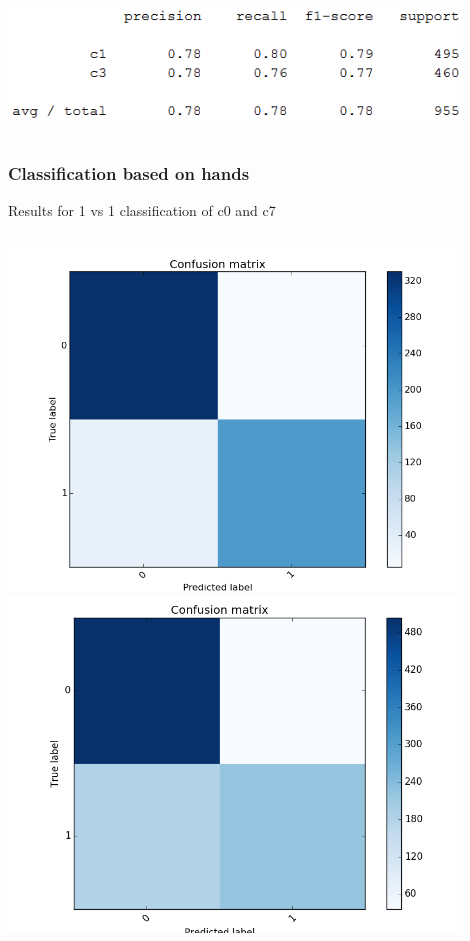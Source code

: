 \documentclass{beamer}
\begin{document}
\begin{frame}
\begin{columns}
\begin{column}{0.7\textwidth}
\begin{center}
					\includegraphics[width=0.9\textwidth]{handpose_p20_c1+c3_txt}\\
				\end{center}
			\end{column}
		\end{columns}		
	\end{frame}
	
\begin{frame}
	\frametitle{Classification based on hands}
	Results for 1 vs 1 classification of c0 and c7
	\begin{columns}
		\begin{column}{0.3\textwidth}
			\begin{center}
				\includegraphics[width=0.9\textwidth]{handpose_p8_c0+c7}\\
				\includegraphics[width=0.9\textwidth]{handpose_p20_c0+c7}\\

\end{center}
\end{column}
\end{columns}
\end{frame}
\end{document}
